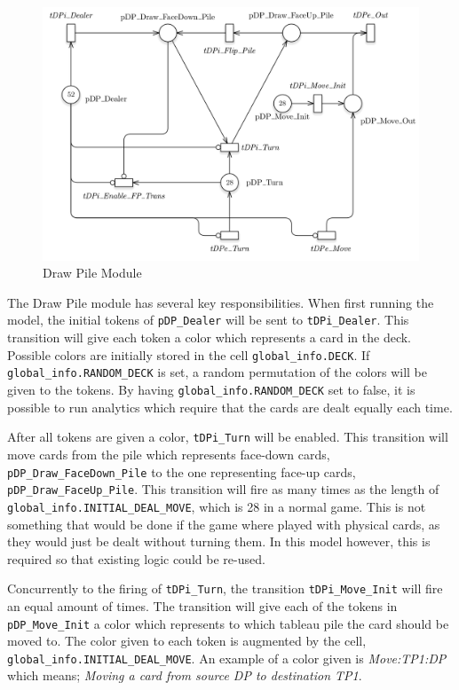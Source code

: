 \documentclass[runningheads,a4paper]{llncs}
\begin{document}
\begin{figure}
	\begin{center}
		\includegraphics[width=\textwidth]{images/drawPile}
		\caption{Draw Pile Module}
	\end{center}
\end{figure}
The Draw Pile module has several key responsibilities. When first running the model, the initial tokens of \verb!pDP_Dealer! will be sent to \verb!tDPi_Dealer!. This transition will give each token a color which represents a card in the deck. Possible colors are initially stored in the cell \verb!global_info.DECK!. If \verb!global_info.RANDOM_DECK! is set, a random permutation of the colors will be given to the tokens. By having \verb!global_info.RANDOM_DECK! set to false, it is possible to run analytics which require that the cards are dealt equally each time.
\newline

After all tokens are given a color, \verb!tDPi_Turn! will be enabled. This transition will move cards from the pile which represents face-down cards, \verb!pDP_Draw_FaceDown_Pile! to the one representing face-up cards, \verb!pDP_Draw_FaceUp_Pile!. This transition will fire as many times as the length of \verb!global_info.INITIAL_DEAL_MOVE!, which is 28 in a normal game. This is not something that would be done if the game where played with physical cards, as they would just be dealt without turning them. In this model however, this is required so that existing logic could be re-used.
\newline

Concurrently to the firing of \verb!tDPi_Turn!, the transition \verb!tDPi_Move_Init! will fire an equal amount of times. The transition will give each of the tokens in \verb!pDP_Move_Init! a color which represents to which tableau pile the card should be moved to. The color given to each token is augmented by the cell, \verb!global_info.INITIAL_DEAL_MOVE!. An example of a color given is \emph{Move:TP1:DP} which means; \textit{Moving a card from source DP to destination TP1}.
\end{document}
